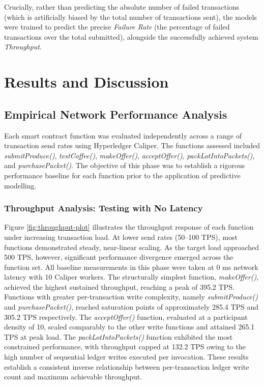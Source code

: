 \documentclass[12pt]{article}
\begin{document}
Crucially, rather than predicting the absolute number of failed transactions (which is artificially biased by the total number of transactions sent), the models were trained to predict the precise \textit{Failure Rate} (the percentage of failed transactions over the total submitted), alongside the successfully achieved system \textit{Throughput}.



\section{Results and Discussion}
\subsection{Empirical Network Performance Analysis}
Each smart contract function was evaluated independently across a range of transaction send rates using Hyperledger Caliper. The functions assessed included \textit{submitProduce()}, \textit{testCoffee()}, \textit{makeOffer()}, \textit{acceptOffer()}, \textit{packLotIntoPackets()}, and \textit{purchasePacket()}. The objective of this phase was to establish a rigorous performance baseline for each function prior to the application of predictive modelling.

\subsubsection{Throughput Analysis: Testing with No Latency}
Figure \ref{fig:throughput-plot} illustrates the throughput response of each function under increasing transaction load. At lower send rates (50--100 TPS), most functions demonstrated steady, near-linear scaling. As the target load approached 500 TPS, however, significant performance divergence emerged across the function set. All baseline measurements in this phase were taken at 0 ms network latency with 10 Caliper workers. The structurally simplest function, \textit{makeOffer()}, achieved the highest sustained throughput, reaching a peak of 395.2 TPS. Functions with greater per-transaction write complexity, namely \textit{submitProduce()} and \textit{purchasePacket()}, reached saturation points of approximately 285.4 TPS and 305.2 TPS respectively. The \textit{acceptOffer()} function, evaluated at a participant density of 10, scaled comparably to the other write functions and attained 265.1 TPS at peak load. The \textit{packLotIntoPackets()} function exhibited the most constrained performance, with throughput capped at 132.2 TPS owing to the high number of sequential ledger writes executed per invocation. These results establish a consistent inverse relationship between per-transaction ledger write count and maximum achievable throughput.
\end{document}
